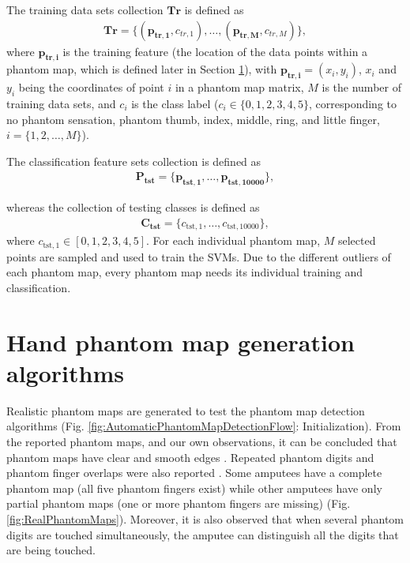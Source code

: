 The training data sets collection $\mathbf{Tr}$ is defined as
\begin{gather}
\label{Eq:TrainingDataSetDefinition}
\mathbf{Tr} =\{ (\mathbf{p_{tr,1}}, c_{tr,1}), \dots ,(\mathbf{p_{tr,M}}, c_{tr,M}) \},
\end{gather}
where $\mathbf{p_{tr,i}}$ is the training feature (the location of the data points within a phantom map, which is defined later in Section \ref{chap2:sec:hand_phantom_map_generation_algorithms}), with $\mathbf{p_{tr,i}} = (x_i, y_i)$, $x_i$ and $y_i$ being the coordinates of point $i$ in a phantom map matrix, $M$ is the number of training data sets, and $c_i$ is the class label ($c_i  \in \{0, 1, 2, 3, 4, 5\}$, corresponding to no phantom sensation, phantom thumb, index, middle, ring, and little finger,  $i = \{1, 2, \dots, M\}$). 

The classification feature sets collection is defined as
\begin{gather}
\label{Eq:TestingFeatureSetDefinition}
\mathbf{P_{tst}} =\{ \mathbf{p_{tst,1}},  \dots ,\mathbf{p_{tst,10000}} \},   
\end{gather}

whereas the collection of testing classes is defined as
\begin{gather}
\label{Eq:TestingClassSetDefinition}
\mathbf{C_{\text{tst}} }=\{ c_{\text{tst},1},  \dots ,c_{\text{tst},10000} \},
\end{gather}
where  $c_{\text{tst},1} \in {[ 0, 1, 2, 3, 4, 5]}$.
For each individual phantom map, $M$ selected points are sampled and used to train the SVMs. Due to the different outliers of each phantom map, every phantom map needs its individual training and classification.


\section{Hand phantom map generation algorithms}
\label{chap2:sec:hand_phantom_map_generation_algorithms}
Realistic phantom maps are generated to test the phantom map detection algorithms  (Fig. \ref{fig:AutomaticPhantomMapDetectionFlow}: Initialization).  
From the reported phantom maps, and our own observations, it can be concluded that phantom maps have clear and smooth edges \cite{antfolk2012sensory, zhang2015somatotopical}. Repeated phantom digits and phantom finger overlaps were also reported \cite{zhang2015somatotopical}. Some amputees have a complete phantom map (all five phantom fingers exist) while other amputees have only partial phantom maps (one or more phantom fingers are missing) (Fig. \ref{fig:RealPhantomMaps}). 
Moreover, it is also observed that when several phantom digits are touched simultaneously, the amputee can distinguish all the digits that are being touched. 

